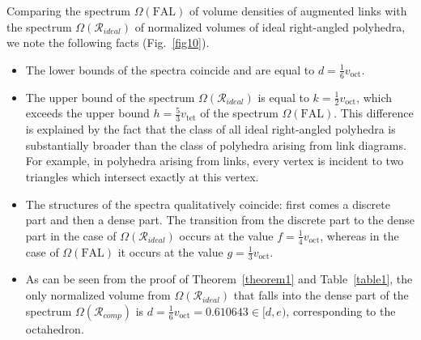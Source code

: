\documentclass{amsart}
\newcommand{\voct}{v_{\mathrm{oct}}}
\newcommand{\vtet}{v_{\mathrm{tet}}}
\begin{document}
Comparing the spectrum $\Omega(\textrm{FAL})$ of volume densities of augmented links with the spectrum $\Omega(\mathcal R_{ideal})$ of normalized volumes of ideal right-angled polyhedra, we note the following facts (Fig.~\ref{fig10}).
\begin{itemize}
\item[(1)] The lower bounds of the spectra coincide and are equal to $d = \frac{1}{6} \voct$.
\item[(2)] The upper bound of the spectrum $\Omega(\mathcal R_{ideal})$ is equal to $k=\frac{1}{2} \voct$, which exceeds the upper bound $h= \frac{5}{3}\vtet$ of the spectrum $\Omega(\textrm{FAL})$. This difference is explained by the fact that the class of all ideal right-angled polyhedra is substantially broader than the class of polyhedra arising from link diagrams. For example, in polyhedra arising from links, every vertex is incident to two triangles which intersect exactly at this vertex.
\item[(3)] The structures of the spectra qualitatively coincide: first comes a discrete part and then a dense part. The transition from the discrete part to the dense part in the case of $\Omega(\mathcal R_{ideal})$ occurs at the value $f = \frac{1}{4} \voct$, whereas in the case of $\Omega(\textrm{FAL})$ it occurs at the value $g = \frac{1}{3} \voct$.
\item[(4)] As can be seen from the proof of Theorem~\ref{theorem1} and Table~\ref{table1}, the only normalized volume from $\Omega(\mathcal R_{ideal})$ that falls into the dense part of the spectrum $\Omega(\mathcal R_{comp})$ is $d = \frac{1}{6} \voct = 0.610643 \in [d, e)$, corresponding to the octahedron.
\end{itemize}	
\end{document}

